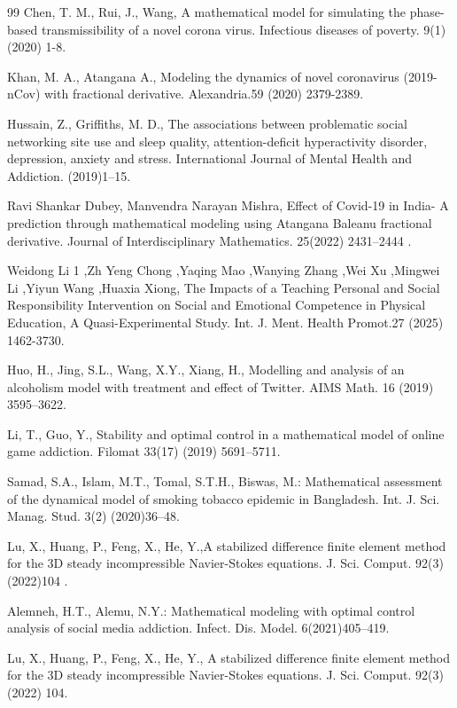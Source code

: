 \documentclass[10pt]{NSP1}
\begin{document}
\begin{thebibliography}{99}
Chen, T. M., Rui, J., Wang, A mathematical model for simulating the phase-based transmissibility of a novel corona virus. Infectious diseases of poverty. 9(1)(2020) 1-8.

Khan, M. A., Atangana A., Modeling the dynamics of novel coronavirus (2019-nCov) with fractional derivative. Alexandria.59 (2020) 2379-2389.

Hussain, Z., Griffiths, M. D., The associations between problematic social networking site use and sleep quality, attention-deficit hyperactivity disorder, depression, anxiety and stress. International Journal of Mental Health and Addiction. (2019)1–15.

Ravi Shankar Dubey, Manvendra Narayan Mishra, Effect of Covid-19 in India- A prediction through mathematical modeling using Atangana Baleanu fractional derivative. Journal of Interdisciplinary Mathematics. 25(2022) 2431–2444 .

Weidong Li 1 ,Zh Yeng Chong ,Yaqing Mao ,Wanying Zhang ,Wei Xu ,Mingwei Li ,Yiyun Wang ,Huaxia Xiong, The Impacts of a Teaching Personal and Social Responsibility Intervention on Social and Emotional Competence in Physical Education, A Quasi-Experimental Study. Int. J. Ment. Health Promot.27 (2025) 1462-3730.

Huo, H., Jing, S.L., Wang, X.Y., Xiang, H., Modelling and analysis of an alcoholism model with treatment and effect of Twitter. AIMS Math. 16 (2019) 3595–3622.

Li, T., Guo, Y., Stability and optimal control in a mathematical model of online game addiction. Filomat 33(17) (2019) 5691–5711.

Samad, S.A., Islam, M.T., Tomal, S.T.H., Biswas, M.: Mathematical assessment of the dynamical model of smoking tobacco epidemic in Bangladesh. Int. J. Sci. Manag. Stud. 3(2) (2020)36–48.

Lu, X., Huang, P., Feng, X., He, Y.,A stabilized difference finite element method for the 3D steady incompressible Navier-Stokes equations. J. Sci. Comput. 92(3) (2022)104 .

Alemneh, H.T., Alemu, N.Y.: Mathematical modeling with optimal control analysis of social media addiction. Infect. Dis. Model. 6(2021)405–419.

Lu, X., Huang, P., Feng, X., He, Y., A stabilized difference finite element method for the 3D steady incompressible Navier-Stokes equations. J. Sci. Comput. 92(3) (2022) 104.


\end{thebibliography}
\end{document}
